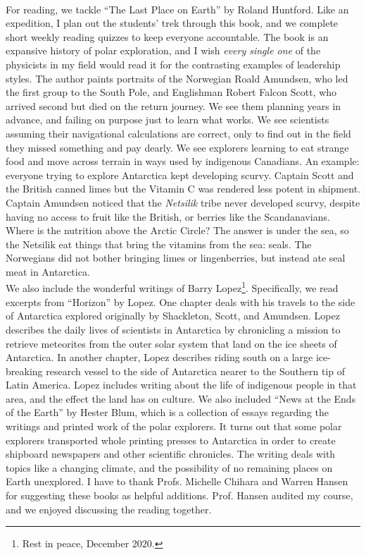 \documentclass[../../../main.tex]{subfiles}
\begin{document}
\\
\vspace{0.25cm}
For reading, we tackle ``The Last Place on Earth'' by Roland Huntford.  Like an expedition, I plan out the students' trek through this book, and we complete short weekly reading quizzes to keep everyone accountable.  The book is an expansive history of polar exploration, and I wish \textit{every single one} of the physicists in my field would read it for the contrasting examples of leadership styles.  The author paints portraits of the Norwegian Roald Amundsen, who led the first group to the South Pole, and Englishman Robert Falcon Scott, who arrived second but died on the return journey.  We see them planning years in advance, and failing on purpose just to learn what works.  We see scientists assuming their navigational calculations are correct, only to find out in the field they missed something and pay dearly.  We see explorers learning to eat strange food and move across terrain in ways used by indigenous Canadians.  An example: everyone trying to explore Antarctica kept developing scurvy.  Captain Scott and the British canned limes but the Vitamin C was rendered less potent in shipment.  Captain Amundsen noticed that the \textit{Netsilik} tribe never developed scurvy, despite having no access to fruit like the British, or berries like the Scandanavians.  Where is the nutrition above the Arctic Circle?  The answer is under the sea, so the Netsilik eat things that bring the vitamins from the sea: seals.  The Norwegians did not bother bringing limes or lingenberries, but instead ate seal meat in Antarctica.
\\
\vspace{0.25cm}
We also include the wonderful writings of Barry Lopez\footnote{Rest in peace, December 2020.}.  Specifically, we read excerpts from ``Horizon'' by Lopez.  One chapter deals with his travels to the side of Antarctica explored originally by Shackleton, Scott, and Amundsen.  Lopez describes the daily lives of scientists in Antarctica by chronicling a mission to retrieve meteorites from the outer solar system that land on the ice sheets of Antarctica.  In another chapter, Lopez describes riding south on a large ice-breaking research vessel to the side of Antarctica nearer to the Southern tip of Latin America.  Lopez includes writing about the life of indigenous people in that area, and the effect the land has on culture.  We also included ``News at the Ends of the Earth'' by Hester Blum, which is a collection of essays regarding the writings and printed work of the polar explorers.  It turns out that some polar explorers transported whole printing presses to Antarctica in order to create shipboard newspapers and other scientific chronicles.  The writing deals with topics like a changing climate, and the possibility of no remaining places on Earth unexplored.  I have to thank Profs. Michelle Chihara and Warren Hansen for suggesting these books as helpful additions.  Prof. Hansen audited my course, and we enjoyed discussing the reading together.
\end{document}
